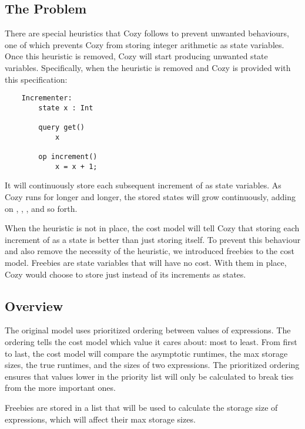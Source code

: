 \subsection{The Problem}
There are special heuristics that Cozy follows to prevent unwanted behaviours,
one of which prevents Cozy from storing integer arithmetic as state variables.
Once this heuristic is removed, Cozy will start producing unwanted state
variables. Specifically, when the heuristic is removed and Cozy is provided with
this specification:

\begin{center}
\begin{lstlisting}
    Incrementer:
        state x : Int
        
        query get()
            x
            
        op increment()
            x = x + 1;
\end{lstlisting}
\end{center}

It will continuously store each subsequent increment of  as state
variables. As Cozy runs for longer and longer, the stored states will grow
continuously, adding on , ,
, and so forth.

When the heuristic is not in place, the cost model will tell Cozy that storing
each increment of  as a state is better than just storing 
itself. To prevent this behaviour and also remove the necessity of the
heuristic, we introduced freebies to the cost model. Freebies are state
variables that will have no cost. With them in place, Cozy would choose to store
just  instead of its increments as states.

\subsection{Overview}
The original model uses prioritized ordering between values of expressions. The
ordering tells the cost model which value it cares about: most to least. From
first to last, the cost model will compare the asymptotic runtimes, the max
storage sizes, the true runtimes, and the sizes of two expressions. The
prioritized ordering ensures that values lower in the priority list will only be
calculated to break ties from the more important ones.

Freebies are stored in a list that will be used to calculate the storage size of
expressions, which will affect their max storage sizes.

